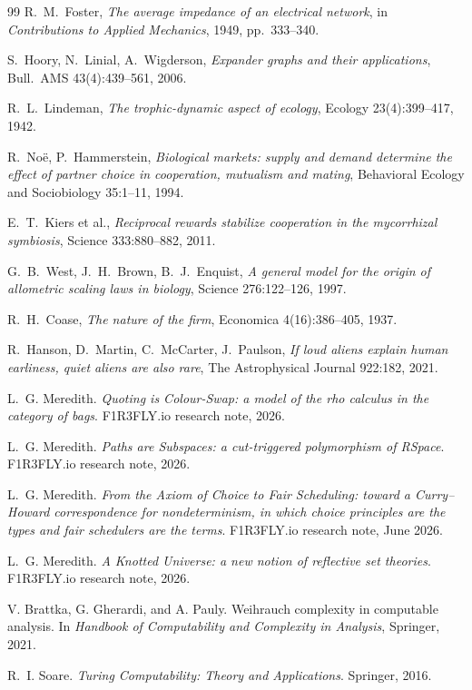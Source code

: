 \begin{thebibliography}{99}
R.~M.~Foster, \emph{The average impedance of an electrical network}, in \emph{Contributions to Applied Mechanics}, 1949, pp.~333--340.

S.~Hoory, N.~Linial, A.~Wigderson, \emph{Expander graphs and their applications}, Bull.\ AMS 43(4):439--561, 2006.

R.~L.~Lindeman, \emph{The trophic-dynamic aspect of ecology}, Ecology 23(4):399--417, 1942.

R.~No\"e, P.~Hammerstein, \emph{Biological markets: supply and demand determine the effect of partner choice in cooperation, mutualism and mating}, Behavioral Ecology and Sociobiology 35:1--11, 1994.

E.~T.~Kiers et al., \emph{Reciprocal rewards stabilize cooperation in the mycorrhizal symbiosis}, Science 333:880--882, 2011.

G.~B.~West, J.~H.~Brown, B.~J.~Enquist, \emph{A general model for the origin of allometric scaling laws in biology}, Science 276:122--126, 1997.

R.~H.~Coase, \emph{The nature of the firm}, Economica 4(16):386--405, 1937.

R.~Hanson, D.~Martin, C.~McCarter, J.~Paulson, \emph{If loud aliens explain human earliness, quiet aliens are also rare}, The Astrophysical Journal 922:182, 2021.


L.~G. Meredith. \emph{Quoting is Colour-Swap: a model of the rho calculus in the
category of bags}. F1R3FLY.io research note, 2026.

L.~G. Meredith. \emph{Paths are Subspaces: a cut-triggered polymorphism of RSpace}.
F1R3FLY.io research note, 2026.

L.~G. Meredith. \emph{From the Axiom of Choice to Fair Scheduling: toward a
Curry--Howard correspondence for nondeterminism, in which choice principles are the
types and fair schedulers are the terms}. F1R3FLY.io research note, June 2026.

L.~G. Meredith. \emph{A Knotted Universe: a new notion of reflective set theories}.
F1R3FLY.io research note, 2026.

V. Brattka, G. Gherardi, and A. Pauly. Weihrauch complexity in computable analysis.
In \emph{Handbook of Computability and Complexity in Analysis}, Springer, 2021.

R.~I. Soare. \emph{Turing Computability: Theory and Applications}. Springer, 2016.


\end{thebibliography}

